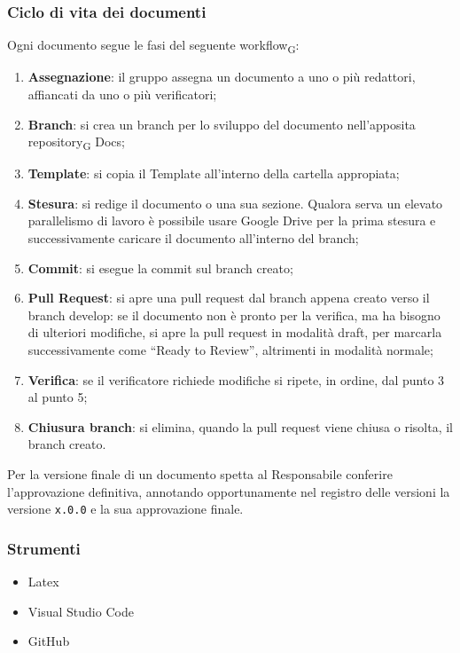 \subsubsection{Ciclo di vita dei documenti}
Ogni documento segue le fasi del seguente workflow\textsubscript{G}:
\begin{enumerate}
    \item \textbf{Assegnazione}: il gruppo assegna un documento a uno o più redattori, affiancati da uno o più verificatori;
    \item \textbf{Branch}: si crea un branch per lo sviluppo del documento nell’apposita repository\textsubscript{G} Docs;
    \item \textbf{Template}: si copia il Template all'interno della cartella appropiata;
    \item \textbf{Stesura}: si redige il documento o una sua sezione. Qualora serva un elevato parallelismo di lavoro è possibile usare Google Drive per la prima stesura e successivamente caricare il documento all’interno del branch;
    \item \textbf{Commit}: si esegue la commit sul branch creato;
    \item \textbf{Pull Request}: si apre una pull request dal branch appena creato verso il branch develop: se il documento non è pronto per la verifica, ma ha bisogno di ulteriori modifiche, si apre la pull request in modalità draft, per marcarla successivamente come “Ready to Review”, altrimenti in modalità normale;
    \item \textbf{Verifica}: se il verificatore richiede modifiche si ripete, in ordine, dal punto 3 al punto 5;
    \item \textbf{Chiusura branch}: si elimina, quando la pull request viene chiusa o risolta, il branch creato.
\end{enumerate}
Per la versione finale di un documento spetta al Responsabile conferire l’approvazione definitiva, annotando opportunamente nel registro delle versioni la versione \texttt{x.0.0} e la sua approvazione finale.


\subsubsection{Strumenti}
\begin{itemize}
    \item Latex
    \item Visual Studio Code
    \item GitHub
\end{itemize}
